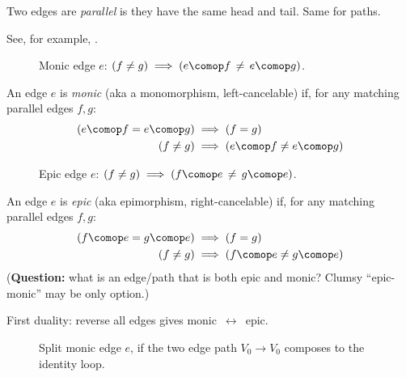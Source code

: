 \documentclass[11pt]{book}
\begin{document}
Two edges are \textit{parallel} is they have the same head and tail.
Same for paths.


See, for example, \cite{perrone_2019_cath_notes}.

\begin{figure}
\centering
{}
\caption{Monic edge $e$: 
$\left( f \neq g \right) 
\implies 
\left( e \comop f \, \neq \, e \comop g \right)$.}
\label{fig:monic}
\end{figure}

An edge $e$ is \textit{monic} (aka a monomorphism, left-cancelable)
if, for any matching parallel edges $f,g$:
\begin{align*}
\left( e \comop f = e \comop g \right) 
& 
\implies 
\left( f = g \right) 
\\
\left( f \neq g \right) 
&
\implies 
\left( e \comop f \neq e \comop g \right) 
\end{align*}

\begin{figure}
\centering
{}
\caption{Epic edge $e$: 
$\left( f \neq g \right)
 \implies 
 \left( f \comop e \, \neq \, g \comop e \right)$.}
\label{fig:epic}
\end{figure}

An edge $e$ is \textit{epic} (aka epimorphism, right-cancelable)
if, for any matching parallel edges $f,g$:
\begin{align*}
\left( f \comop e = g \comop e \right) 
& 
\implies 
\left( f = g \right)
\\
\left( f \neq g \right)
& 
\implies 
\left( f \comop e \neq g \comop e \right) 
\end{align*}
(\textbf{Question:} 
what is an edge/path that is both epic and monic?
Clumsy ``epic-monic'' may be only option.)

First duality: reverse all edges gives monic $\,\leftrightarrow\,$ epic.

\begin{figure}
\centering
{}
\caption{Split monic edge $e$, if the two edge path
$V_0 \longrightarrow V_0$
composes to the identity loop.}
\label{fig:split_monic}
\end{figure}
\end{document}
